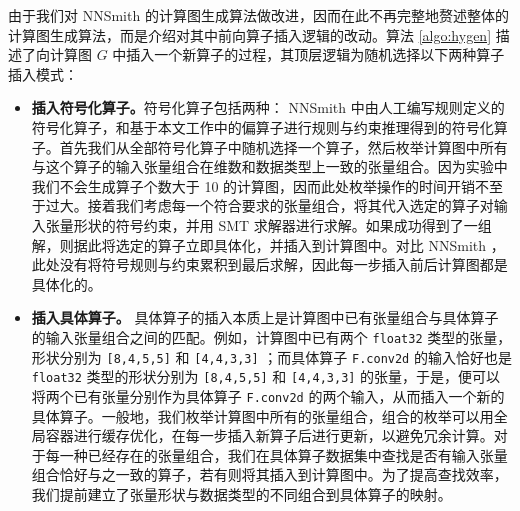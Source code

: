 由于我们对 NNSmith 的计算图生成算法做改进，因而在此不再完整地赘述整体的计算图生成算法，而是介绍对其中前向算子插入逻辑的改动。算法 \ref{algo:hygen} 描述了向计算图 $G$ 中插入一个新算子的过程，其顶层逻辑为随机选择以下两种算子插入模式：
\begin{itemize}
    \item \textbf{插入符号化算子。}符号化算子包括两种： NNSmith 中由人工编写规则定义的符号化算子，和基于本文工作中的偏算子进行规则与约束推理得到的符号化算子。首先我们从全部符号化算子中随机选择一个算子，然后枚举计算图中所有与这个算子的输入张量组合在维数和数据类型上一致的张量组合。因为实验中我们不会生成算子个数大于 10 的计算图，因而此处枚举操作的时间开销不至于过大。接着我们考虑每一个符合要求的张量组合，将其代入选定的算子对输入张量形状的符号约束，并用 SMT 求解器进行求解。如果成功得到了一组解，则据此将选定的算子立即具体化，并插入到计算图中。对比 NNSmith ，此处没有将符号规则与约束累积到最后求解，因此每一步插入前后计算图都是具体化的。
    \item \textbf{插入具体算子。} 具体算子的插入本质上是计算图中已有张量组合与具体算子的输入张量组合之间的匹配。例如，计算图中已有两个 \texttt{float32} 类型的张量，形状分别为 \texttt{[8,4,5,5]} 和 \texttt{[4,4,3,3]} ；而具体算子 \texttt{F.conv2d} 的输入恰好也是 \texttt{float32} 类型的形状分别为 \texttt{[8,4,5,5]} 和 \texttt{[4,4,3,3]} 的张量，于是，便可以将两个已有张量分别作为具体算子 \texttt{F.conv2d} 的两个输入，从而插入一个新的具体算子。一般地，我们枚举计算图中所有的张量组合，组合的枚举可以用全局容器进行缓存优化，在每一步插入新算子后进行更新，以避免冗余计算。对于每一种已经存在的张量组合，我们在具体算子数据集中查找是否有输入张量组合恰好与之一致的算子，若有则将其插入到计算图中。为了提高查找效率，我们提前建立了张量形状与数据类型的不同组合到具体算子的映射。
\end{itemize}

